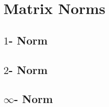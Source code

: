 \section{Matrix Norms}

	\subsection{$1$- Norm}

	\subsection{$2$- Norm}

	\subsection{$\infty$- Norm}
